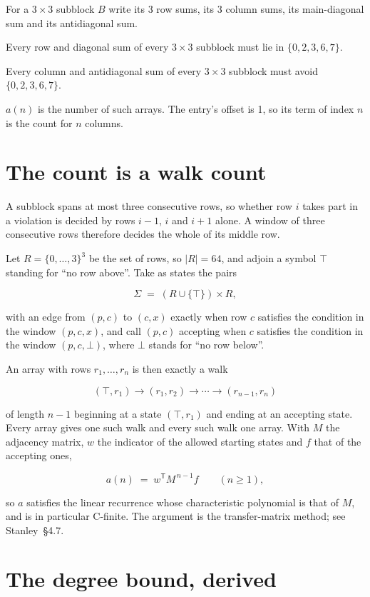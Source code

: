 \documentclass[11pt]{article}
\theoremstyle{definition}
\begin{document}
For a $3\times3$ subblock $B$ write its 3 row sums, its 3 column sums, its main-diagonal sum and its antidiagonal sum.

Every row and diagonal sum of every $3\times3$ subblock must lie in $\{0, 2, 3, 6, 7\}$.

Every column and antidiagonal sum of every $3\times3$ subblock must avoid $\{0, 2, 3, 6, 7\}$.

$a(n)$ is the number of such arrays. The entry's offset is 1, so its term of index $n$ is the count for $n$ columns.

\section{The count is a walk count}

A subblock spans at most three consecutive rows, so whether row $i$ takes part in a violation is decided by rows $i-1$, $i$ and $i+1$ alone. A window of three consecutive rows therefore decides the whole of its middle row.

Let $R = \{0,\dots,3\}^{3}$ be the set of rows, so $|R| = 64$, and adjoin a symbol $\top$ standing for ``no row above''. Take as states the pairs

\[\Sigma \;=\; (R \cup \{\top\}) \times R,\]

with an edge from $(p,c)$ to $(c,x)$ exactly when row $c$ satisfies the condition in the window $(p,c,x)$, and call $(p,c)$ accepting when $c$ satisfies the condition in the window $(p,c,\bot)$, where $\bot$ stands for ``no row below''.

An array with rows $r_1,\dots,r_n$ is then exactly a walk

\[(\top,r_1) \to (r_1,r_2) \to \cdots \to (r_{n-1},r_n)\]

of length $n-1$ beginning at a state $(\top,r_1)$ and ending at an accepting state. Every array gives one such walk and every such walk one array. With $M$ the adjacency matrix, $w$ the indicator of the allowed starting states and $f$ that of the accepting ones,

\[a(n) \;=\; w^{\mathsf T} M^{\,n-1} f \qquad (n \ge 1),\]

so $a$ satisfies the linear recurrence whose characteristic polynomial is that of $M$, and is in particular C-finite. The argument is the transfer-matrix method; see Stanley~\S4.7.

\section{The degree bound, derived}
\end{document}
